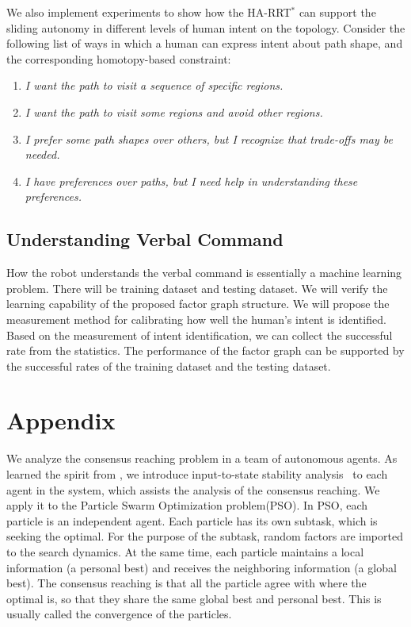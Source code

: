 \documentclass[phd]{byuprop}
\begin{document}
We also implement experiments to show how the HA-RRT$^{*}$ can support the sliding autonomy in different levels of human intent on the topology.
Consider the following list of ways in which a human can express intent about path shape, and the corresponding homotopy-based constraint:
\begin{enumerate}
\item \emph{I want the path to visit a sequence of specific regions.}
\item \emph{I want the path to visit some regions and avoid other regions.}
\item \emph{I prefer some path shapes over others, but I recognize that trade-offs may be needed.} 
\item \emph{I have preferences over paths, but I need help in understanding these preferences.}
\end{enumerate}

\subsection{Understanding Verbal Command}


How the robot understands the verbal command is essentially a machine learning problem.
There will be training dataset and testing dataset.
We will verify the learning capability of the proposed factor graph structure.
We will propose the measurement method for calibrating how well the human's intent is identified.
Based on the measurement of intent identification, we can collect the successful rate from the statistics.
The performance of the factor graph can be supported by the successful rates of the training dataset and the testing dataset.

\section{Appendix}

We analyze the consensus reaching problem in a team of autonomous agents.
As learned the spirit from \cite{1470210}, we introduce input-to-state stability analysis~\cite{Jiang2001} to each agent in the system, which assists the analysis of the consensus reaching.
We apply it to the Particle Swarm Optimization problem(PSO).
In PSO, each particle is an independent agent.
Each particle has its own subtask, which is seeking the optimal.
For the purpose of the subtask, random factors are imported to the search dynamics.
At the same time, each particle maintains a local information (a personal best) and receives the neighboring information (a global best).
The consensus reaching is that all the particle agree with where the optimal is, so that they share the same global best and personal best.
This is usually called the convergence of the particles.
\end{document}
